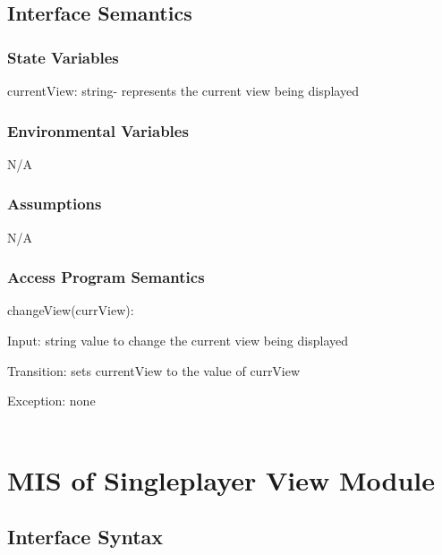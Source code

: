 \documentclass[12,english]{article}
\begin{document}
	\subsection{Interface Semantics}
		\subsubsection{State Variables}
		currentView: string- represents the current view being displayed
		
		\subsubsection{Environmental Variables}
		N/A
		\subsubsection{Assumptions}
        N/A
		\subsubsection{Access Program Semantics}
		changeView(currView):

		Input: string value to change the current view being displayed
		
		Transition: sets currentView to the value of currView
		
		Exception: none\\
		\\


\newpage
\section{MIS of Singleplayer View Module}
	\subsection{Interface Syntax}
\end{document}
